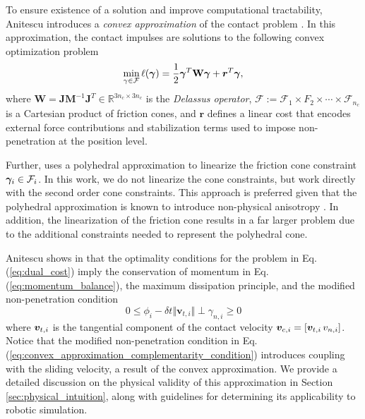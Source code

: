 To ensure existence of a solution and improve computational tractability,
Anitescu introduces a \textit{convex approximation} of the contact
problem \cite{bib:anitescu2006}. In this approximation, the contact impulses are
solutions to the following convex optimization problem
\begin{eqnarray}
	\min_{\gamma\in \mathcal{F}} \ell(\bgamma) =
	\frac{1}{2}\bgamma^T\mathbf{W}\bgamma + {\bm r}^T
	\bgamma,
	\label{eq:dual_cost}
\end{eqnarray}
where $\mathbf{W} =
\mathbf{J}\mathbf{M}^{-1}\mathbf{J}^T\in\mathbb{R}^{3n_c\times 3n_c}$ is the
\emph{Delassus operator}, $\mathcal{F} := \mathcal{F}_1 \times F_2 \times \cdots
\times \mathcal{F}_{n_c}$ is a Cartesian product of friction cones, and ${\bm
r}$ defines a linear cost that encodes external force contributions and
stabilization terms used to impose non-penetration at the position level.

Further, \cite{bib:anitescu2006} uses a polyhedral approximation to linearize
the friction cone constraint ${\bm\gamma}_i\in\mathcal{F}_i$. In this work, we do not
linearize the cone constraints, but work directly with the second order cone
constraints. This approach is preferred given that the polyhedral
approximation is known to introduce non-physical anisotropy
\cite{bib:li2018implicit}. In addition, the linearization of the friction cone
results in a far larger problem due to the additional constraints
needed to represent the polyhedral cone.

Anitescu shows in \cite{bib:anitescu2006} that the optimality conditions for the
problem in Eq. (\ref{eq:dual_cost}) imply the conservation of momentum in Eq.
(\ref{eq:momentum_balance}), the maximum dissipation principle, and the modified
non-penetration condition
\begin{equation}
	0 \le \phi_i - \delta t \Vert {\bm v}_{t,i} \Vert \perp \gamma_{n,i} \ge 0
	\label{eq:convex_approximation_complementarity_condition}
\end{equation}
where ${\bm{v}}_{t,i}$ is the tangential component of the contact velocity
${\bm{v}}_{c,i} = [{\bm{v}}_{t,i}\,v_{n,i}]$. Notice that the modified non-penetration
condition in Eq. (\ref{eq:convex_approximation_complementarity_condition}) 
introduces coupling with the sliding velocity, a
result of the convex approximation. We provide a detailed discussion on the
physical validity of this approximation in Section \ref{sec:physical_intuition},
along with guidelines for determining its applicability to robotic simulation.

